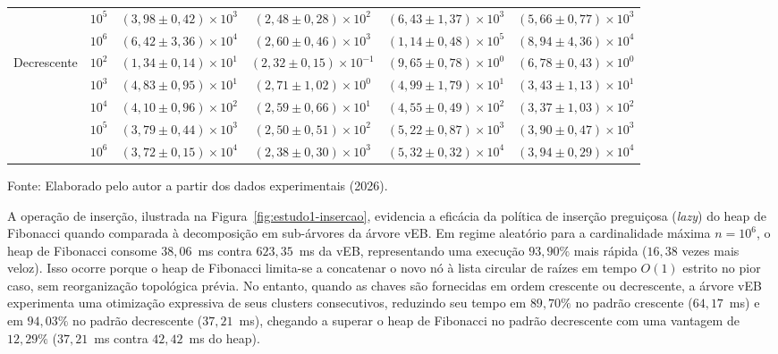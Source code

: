 \documentclass[12pt,a4paper]{report}
\begin{document}
\begin{table}[htbp]
\begin{tabular}{llcccc}
     & $10^{5}$ & $(3,98 \pm 0,42) \times 10^{3}$ & $(2,48 \pm 0,28) \times 10^{2}$ & $(6,43 \pm 1,37) \times 10^{3}$ & $(5,66 \pm 0,77) \times 10^{3}$ \\
     & $10^{6}$ & $(6,42 \pm 3,36) \times 10^{4}$ & $(2,60 \pm 0,46) \times 10^{3}$ & $(1,14 \pm 0,48) \times 10^{5}$ & $(8,94 \pm 4,36) \times 10^{4}$ \\
    \cmidrule{2-6}
    \multirow{5}{*}{Decrescente} & $10^{2}$ & $(1,34 \pm 0,14) \times 10^{1}$ & $(2,32 \pm 0,15) \times 10^{-1}$ & $(9,65 \pm 0,78) \times 10^{0}$ & $(6,78 \pm 0,43) \times 10^{0}$ \\
     & $10^{3}$ & $(4,83 \pm 0,95) \times 10^{1}$ & $(2,71 \pm 1,02) \times 10^{0}$ & $(4,99 \pm 1,79) \times 10^{1}$ & $(3,43 \pm 1,13) \times 10^{1}$ \\
     & $10^{4}$ & $(4,10 \pm 0,96) \times 10^{2}$ & $(2,59 \pm 0,66) \times 10^{1}$ & $(4,55 \pm 0,49) \times 10^{2}$ & $(3,37 \pm 1,03) \times 10^{2}$ \\
     & $10^{5}$ & $(3,79 \pm 0,44) \times 10^{3}$ & $(2,50 \pm 0,51) \times 10^{2}$ & $(5,22 \pm 0,87) \times 10^{3}$ & $(3,90 \pm 0,47) \times 10^{3}$ \\
     & $10^{6}$ & $(3,72 \pm 0,15) \times 10^{4}$ & $(2,38 \pm 0,30) \times 10^{3}$ & $(5,32 \pm 0,32) \times 10^{4}$ & $(3,94 \pm 0,29) \times 10^{4}$ \\
    \bottomrule
  \end{tabular}
  \vspace{0.2cm}
  
  \raggedright\footnotesize Fonte: Elaborado pelo autor a partir dos dados experimentais (2026).
\end{table}

A operação de inserção, ilustrada na Figura~\ref{fig:estudo1-insercao}, evidencia a eficácia da política de inserção preguiçosa (\textit{lazy}) do heap de Fibonacci quando comparada à decomposição em sub-árvores da árvore vEB. Em regime aleatório para a cardinalidade máxima $n = 10^6$, o heap de Fibonacci consome $38{,}06$~ms contra $623{,}35$~ms da vEB, representando uma execução $93{,}90\%$ mais rápida ($16{,}38$ vezes mais veloz). Isso ocorre porque o heap de Fibonacci limita-se a concatenar o novo nó à lista circular de raízes em tempo $O(1)$ estrito no pior caso, sem reorganização topológica prévia. No entanto, quando as chaves são fornecidas em ordem crescente ou decrescente, a árvore vEB experimenta uma otimização expressiva de seus clusters consecutivos, reduzindo seu tempo em $89{,}70\%$ no padrão crescente ($64{,}17$~ms) e em $94{,}03\%$ no padrão decrescente ($37{,}21$~ms), chegando a superar o heap de Fibonacci no padrão decrescente com uma vantagem de $12{,}29\%$ ($37{,}21$~ms contra $42{,}42$~ms do heap).
\end{document}

